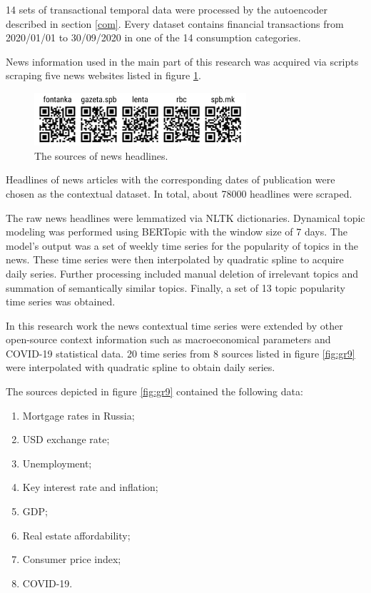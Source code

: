 \documentclass[13pt, a4paper]{article}
\begin{document}
14 sets of transactional temporal data were processed by the autoencoder described in section \ref{com}. Every dataset contains financial transactions from 2020/01/01 to 30/09/2020 in one of the 14 consumption categories.

News information used in the main part of this research was acquired via scripts scraping five news websites listed in figure \ref{fig:gr8}.
\begin{figure}[h!]\vspace*{4pt}
	\centerline{\includegraphics[width=0.7\textwidth]{./visuals/gr8.png}}
\caption{The sources of news headlines.}
\label{fig:gr8}
\end{figure}

Headlines of news articles with the corresponding dates of publication were chosen as the contextual dataset. In total, about 78000 headlines were scraped.

The raw news headlines were lemmatized via NLTK dictionaries. Dynamical topic modeling was performed using BERTopic with the window size of 7 days. The model's output was a set of weekly time series for the popularity of topics in the news. These time series were then interpolated by quadratic spline to acquire daily series. Further processing included manual deletion of irrelevant topics and summation of semantically similar topics. Finally, a set of 13 topic popularity time series was obtained.

In this research work the news contextual time series were extended by other open-source context information such as macroeconomical parameters and COVID-19 statistical data. 20 time series from 8 sources listed in figure \ref{fig:gr9} were interpolated with quadratic spline to obtain daily series.

The sources depicted in figure \ref{fig:gr9} contained the following data:
\begin{enumerate}
\item Mortgage rates in Russia;
\item USD exchange rate;
\item Unemployment;
\item Key interest rate and inflation;
\item GDP;
\item Real estate affordability;
\item Consumer price index;
\item COVID-19.
\end{enumerate}
\end{document}
